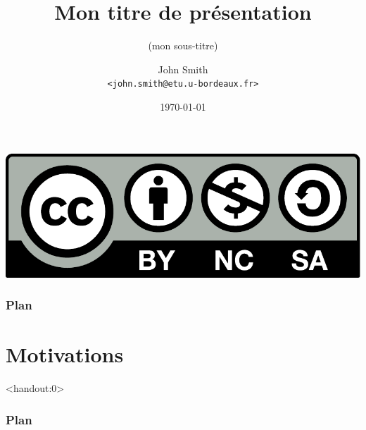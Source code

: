 %
%

\usepackage[french]{babel}

\newcommand{\highlight}[1]{\textcolor{structure.fg}{\bfseries #1}}

\title{Mon titre de présentation}
\subtitle{(mon sous-titre)}

\author[John Smith]{John Smith\\[-.25em]
\texttt{\scriptsize <john.smith@etu.u-bordeaux.fr>}}


\date{\today}



\begin{frame}
  \vspace{3.5em}
  \titlepage

  \begin{center}
    \includegraphics[scale=.2]{cc-by-nc-sa.pdf}
  \end{center}
\end{frame}

\begin{frame}
  \frametitle{Plan}
  \tableofcontents[subsectionstyle=hide]
\end{frame}

\section{Motivations}

\begin{frame}<handout:0>
  \frametitle{Plan}
  \tableofcontents[currentsection,subsectionstyle=hide]
\end{frame}

